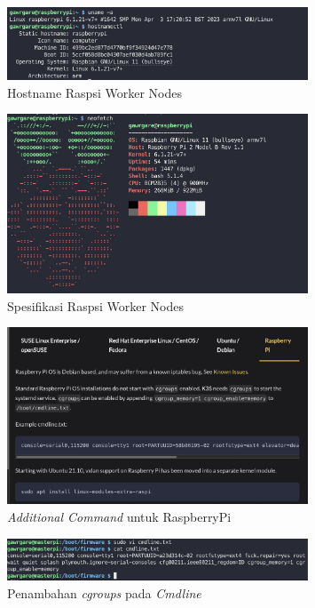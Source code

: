 \begin{figure}[ht]
  \centering
  \includegraphics[width=0.8\textwidth]{resources/chapter-4/pengujian/raspi-01-worker.jpg}
  \caption{Hostname Raspsi Worker Nodes}
  \label{fig:hostname-raspi-worker-nodes}
\end{figure}

\begin{figure}[ht]
  \centering
  \includegraphics[width=0.8\textwidth]{resources/chapter-4/pengujian/raspi-worker-neofetch.jpg}
  \caption{Spesifikasi Raspsi Worker Nodes}
  \label{fig:spesifikasi-raspi-worker-nodes}
\end{figure}

\begin{figure}[ht]
  \centering
  \includegraphics[width=0.8\textwidth]{resources/chapter-4/pengujian/raspi-02-additional.jpg}
  \caption{\textit{Additional Command} untuk RaspberryPi}
  \label{fig:additional-command-raspberrypi}
\end{figure}

\begin{figure}[ht]
  \centering
  \includegraphics[width=0.8\textwidth]{resources/chapter-4/pengujian/raspi-02-additional-02.jpg}
  \caption{Penambahan \textit{cgroups} pada \textit{Cmdline}}
  \label{fig:penambahan-cgroups-pada-cmdline}
\end{figure}

